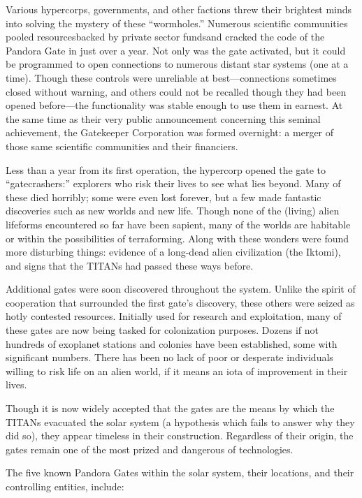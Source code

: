 Various hypercorps, governments, and other factions threw their brightest minds into solving the mystery of these “wormholes.” Numerous scientific communities pooled resourcesbacked by private sector fundsand cracked the code of the Pandora Gate in just over a year. Not only was the gate activated, but it could be programmed to open connections to numerous distant star systems (one at a time). Though these controls were unreliable at best—connections sometimes closed without warning, and others could not be recalled though they had been opened before—the functionality was stable enough to use them in earnest. At the same time as their very public announcement concerning this seminal achievement, the Gatekeeper Corporation was formed overnight: a merger of those same scientific communities and their financiers. 

Less than a year from its first operation, the hypercorp opened the gate to “gatecrashers:” explorers who risk their lives to see what lies beyond. Many of these died horribly; some were even lost forever, but a few made fantastic discoveries such as new worlds and new life. Though none of the (living) alien lifeforms encountered so far have been sapient, many of the worlds are habitable or within the possibilities of terraforming. Along with these wonders were found more disturbing things: evidence of a long-dead alien civilization (the Iktomi), and signs that the TITANs had passed these ways before. 

Additional gates were soon discovered throughout the system. Unlike the spirit of cooperation that surrounded the first gate’s discovery, these others were seized as hotly contested resources. Initially used for research and exploitation, many of these gates are now being tasked for colonization purposes. Dozens if not hundreds of exoplanet stations and colonies have been established, some with significant numbers. There has been no lack of poor or desperate individuals willing to risk life on an alien world, if it means an iota of improvement in their lives. 

Though it is now widely accepted that the gates are the means by which the TITANs evacuated the solar system (a hypothesis which fails to answer why they did so), they appear timeless in their construction. Regardless of their origin, the gates remain one of the most prized and dangerous of technologies. 

The five known Pandora Gates within the solar system, their locations, and their controlling entities, include: 


